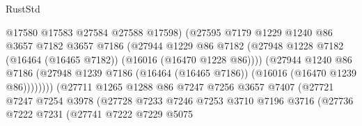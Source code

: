 \begin{lexlean}{RustStd}
\begin{coremodule}
                                      @17580
                                      @17583
                                      @27584
                                      @27588
                                      @17598)
                                    (@27595
                                      @7179
                                      @1229
                                      @1240
                                      @86
                                      @3657
                                      @7182
                                      @3657
                                      @7186
                                      (@27944
                                        @1229
                                        @86
                                        @7182
                                        (@27948
                                          @1228
                                          @7182
                                          (@16464 (@16465 @7182))
                                          (@16016 (@16470 @1228 @86))))
                                      (@27944
                                        @1240
                                        @86
                                        @7186
                                        (@27948
                                          @1239
                                          @7186
                                          (@16464 (@16465 @7186))
                                          (@16016 (@16470 @1239 @86))))))))
                              (@27711
                                @1265
                                @1288
                                @86
                                @7247
                                @7256
                                @3657
                                @7407
                                (@27721
                                  @7247
                                  @7254
                                  @3978
                                  (@27728
                                    @7233
                                    @7246
                                    @7253
                                    @3710
                                    @7196
                                    @3716
                                    (@27736
                                      @7222
                                      @7231
                                      (@27741
                                        @7222
                                        @7229
                                        @5075

\end{coremodule}
\end{lexlean}

